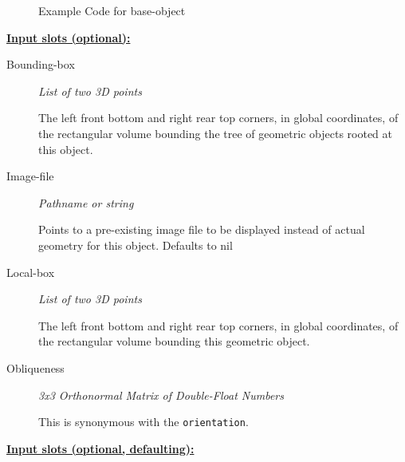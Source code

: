 \documentclass [11pt]{book}
\begin{document}
\begin{itemize}
\begin{figure}
\begin{lrbox}{\boxedverb}
\begin{minipage}{\linewidth}
{\begin{verbatim}
\end{verbatim}}
\end{minipage}
\end{lrbox}
\fbox{\usebox{\boxedverb}}

\caption{Example Code for base-object}

\label{fig:example-code-base-object}

\end{figure}





\textbf{
\underline{Input slots (optional):}}

\begin{description}

\item [Bounding-box]
\emph{List of two 3D points}

 The left front bottom and right rear top corners, in global coordinates,
of the rectangular volume bounding the tree of geometric objects rooted at this object.




\item [Image-file]
\emph{Pathname or string}

 Points to a pre-existing image file to be displayed instead of actual geometry for this object. Defaults to nil




\item [Local-box]
\emph{List of two 3D points}

 The left front bottom and right rear top corners, in global coordinates,
of the rectangular volume bounding this geometric object.




\item [Obliqueness]
\emph{3x3 Orthonormal Matrix of Double-Float Numbers}

 This is synonymous with the \texttt{orientation}.




\end{description}






\textbf{
\underline{Input slots (optional, defaulting):}}

\begin{description}


\end{description}
\end{itemize}
\end{document}
